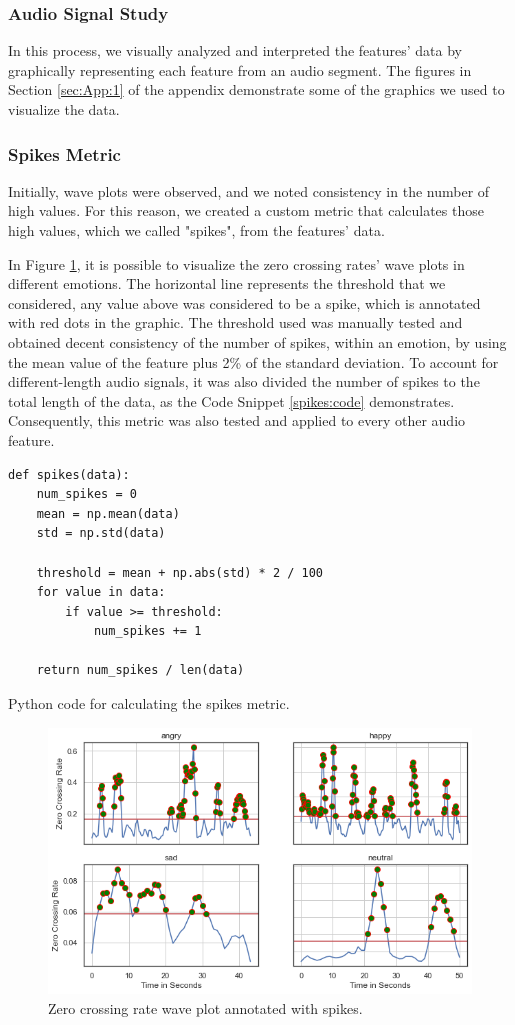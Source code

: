 \subsubsection{Audio Signal Study}

In this process, we visually analyzed and interpreted the features' data by graphically representing each feature from an audio segment. The figures in Section \ref{sec:App:1} of the appendix demonstrate some of the graphics we used to visualize the data.

\subsubsection{Spikes Metric}
\label{spikes:metric}

Initially, wave plots were observed, and we noted consistency in the number of high values. For this reason, we created a custom metric that calculates those high values, which we called "spikes", from the features' data.

In Figure \ref{fig:zcrSpikes}, it is possible to visualize the zero crossing rates' wave plots in different emotions. The horizontal line represents the threshold that we considered, any value above was considered to be a spike, which is annotated with red dots in the graphic. The threshold used was manually tested and obtained decent consistency of the number of spikes, within an emotion, by using the mean value of the feature plus 2\% of the standard deviation. To account for different-length audio signals, it was also divided the number of spikes to the total length of the data, as the Code Snippet \ref{spikes:code} demonstrates. Consequently, this metric was also tested and applied to every other audio feature.

\begin{listing}[H]
	\begin{verbatim}
def spikes(data):
	num_spikes = 0
	mean = np.mean(data)
	std = np.std(data)
	
	threshold = mean + np.abs(std) * 2 / 100
	for value in data:
		if value >= threshold:
			num_spikes += 1

	return num_spikes / len(data)
	\end{verbatim}
	\caption{Python code for calculating the spikes metric.}
	\label{spikes:code}
\end{listing}

\begin{figure}[H]
	\centering
	\includegraphics[width=.7\textwidth]{figs/4_1_traditional/zcr_waveplot_spikes.png}
	\caption{Zero crossing rate wave plot annotated with spikes.}
	\label{fig:zcrSpikes}
\end{figure}


